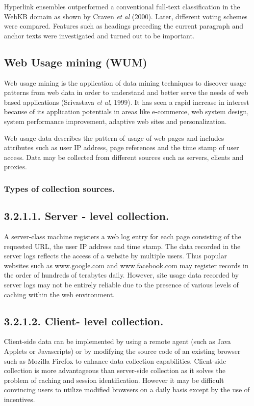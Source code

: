 \documentclass{article}
\begin{document}
Hyperlink ensembles outperformed a conventional full-text classification in the WebKB domain as shown by Craven \textit{et al} (2000). Later, different voting schemes were compared. Features such as headings preceding the current paragraph and anchor texts were investigated and turned out to be important.
\newline
\newline

\pagebreak
\subsection{Web Usage mining (WUM)}
Web usage mining is the application of data mining techniques to discover usage patterns from web data in order to understand and better serve the needs of web based applications (Srivastava \textit{et al}, 1999). It has seen a rapid increase in interest because of its application potentials in areas like e-commerce, web system design, system performance improvement, adaptive web sites and personalization.

Web usage data describes the pattern of usage of web pages and includes attributes such as user IP address, page references and the time stamp of user access. Data may be collected from different sources such as servers, clients and proxies.

\subsubsection{ Types of collection sources.}
\subsection*{\small{3.2.1.1. Server - level collection.}}
 A server-class machine registers a web log entry for each page consisting of the requested URL, the user IP address and time stamp. The data recorded in the server logs reflects the access of a website by multiple users. Thus popular websites such as www.google.com and www.facebook.com  may register records in the order of hundreds of terabytes daily. However, site usage data recorded by server logs may not be entirely reliable due to the presence of various levels of caching within the web environment.
\subsection*{\small{3.2.1.2. Client- level collection}.}
Client-side data can be implemented by using a remote agent (such as Java Applets or Javascripts) or by modifying the source code of an existing browser such as Mozilla Firefox to enhance data collection capabilities. Client-side collection is more advantageous than server-side collection as it solves the problem of caching and session identification. However it may be difficult convincing users to utilize modified browsers on a daily basis except by the use of incentives.
\end{document}
